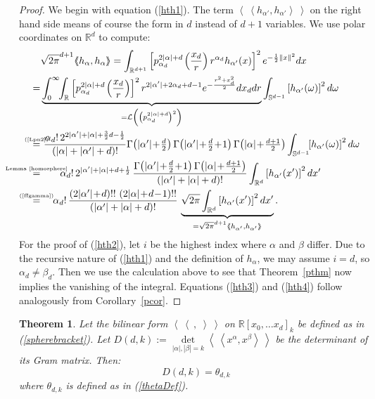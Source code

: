 \documentclass{amsart}
\newcommand{\p}[2]{p_{#1}^{#2}\;\!\!}
\renewcommand{\L}{\mathcal{L}}
\newcommand{\bra}{\left<\!\!\!\:\left<}
\newcommand{\ket}{\right>\!\!\!\:\right>}
\newcommand{\myeq}[1]{\mathrel{\overset{\makebox[0pt]{\text{\tiny #1}}}{=}}}
\newcommand{\R}{\mathbb{R}}
\renewcommand{\S}{\mathbb{S}}
\theoremstyle{plain}
\newtheorem{theorem}{Theorem}[section]
\theoremstyle{definition}
\theoremstyle{remark}
\begin{document}
\begin{proof}
We begin with equation (\ref{hth1}). The term $\bra h_{\alpha '},h_{\alpha '}\ket$ on the right hand side means of course the form in $d$ instead of $d\!+\!1$ variables. We use polar coordinates on $\R^d$ to compute:
\begin{align*}
 & \sqrt{2\pi}^{d+1}\!\bra h_\alpha ,h_\alpha \ket = \int_{\R^{d+1}}\left[\p{\alpha_d}{2|\alpha|+d}\left(\frac{x_d}{r}\right) r^{\alpha_d}h_{\alpha'}(x)\right]^2 e^{-\frac{1}{2}\|x\|^2} dx \\
 = & \underbrace{ \int_0^\infty\!\!\int_{\R} \left[\p{\alpha_d}{2|\alpha|+d}\left(\frac{x_d}{r}\right)\right]^2 r^{2|\alpha'|+2\alpha_d+d-1} e^{-\frac{r^2+x_d^2}{2} }dx_ddr}_{= \L\left(\left(\p{\alpha_d}{2|\alpha|+d}\right)^2\right)}
 \int_{\S^{d-1}}\left[h_{\alpha'}(\omega)\right]^2 d\omega \\
\myeq{(\ref{Lpn2})}& \  \frac{\alpha_d!\, 2^{2|\alpha '|+|\alpha|+\frac{3}{2}d-\frac{1}{2}} }{\left(|\alpha|+|\alpha'|+d\right)!} { \textstyle
\Gamma\!\left( |\alpha'| \!+\!\frac{d}{2}\right)\Gamma\!\left( |\alpha'|\!+\! \frac{d}{2}\!+\! 1\right) \Gamma\!\left( |\alpha| \!+\! \frac{d+1}{2}\right) }\int_{\S^{d-1}}\!\!\left[h_{\alpha'}(\omega)\right]^2 d\omega \\
\myeq{Lemma~\ref{homosphere}}&\quad\quad \alpha_d!\,2^{|\alpha '|+|\alpha |+d+\frac{1}{2}}\,
\frac{\Gamma\!\left(|\alpha '|\!+\!\frac{d}{2}\!+\!1\right)\Gamma\!\left(|\alpha |\!+\!\tfrac{d+1}{2}\right)}{\left(|\alpha '|+|\alpha |+d\right)!} \int_{\R^d} \left[h_{\alpha'}(x')\right]^2 dx' \\
\myeq{(\ref{ffgamma})}& \quad\; 
\alpha_d!\,\frac{\left(2|\alpha '|\!+\!d\right)!!\,\left(2|\alpha |\!+\!d\!-\!1\right)!!}{\left(|\alpha '|+|\alpha |+d\right)!}\, \underbrace{\sqrt{2\pi}\int_{\R^d} \left[h_{\alpha'}(x')\right]^2 dx'}_{=\sqrt{2\pi}^{d+1}\bra h_{\alpha '},h_{\alpha '}\ket} .
\end{align*}
For the proof of (\ref{hth2}), let $i$ be the highest index where $\alpha$ and $\beta$ differ. Due to the recursive nature of (\ref{hth1}) and the definition of $h_\alpha$, we may assume $i=d$, so $\alpha_d \neq \beta_d$. Then we use the calculation above to see that Theorem~\ref{pthm} now implies the vanishing of the integral. Equations (\ref{hth3}) and (\ref{hth4}) follow analogously from Corollary~\ref{pcor}.
\end{proof}
\begin{theorem}\label{thetaCor} Let the bilinear form $\bra\ ,\;\ket$ on $\R[x_0,\ldots x_d]_k$ be defined as in (\ref{spherebracket}). Let $D(d,k):=\det\limits_{|\alpha|,|\beta|=k}\bra x^\alpha ,x^\beta \ket $ be the determinant of its Gram matrix. Then:
$$
D(d,k) = \theta_{d,k}
$$
where $\theta_{d,k}$ is defined as in (\ref{thetaDef}).
\end{theorem}
\end{document}
